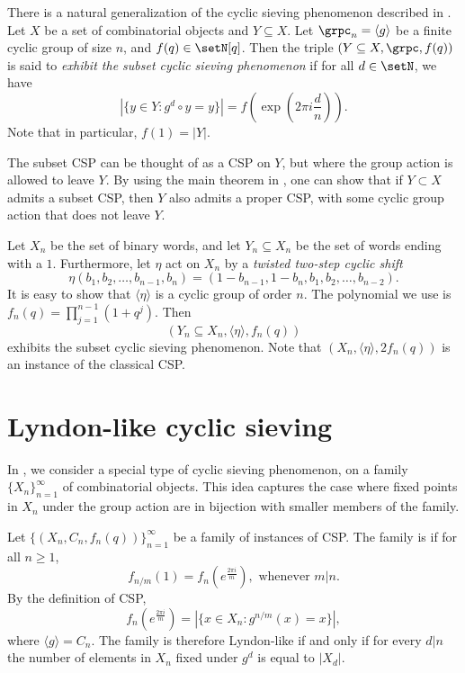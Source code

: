 There is a natural generalization of the cyclic sieving phenomenon described in 
\cite{AlexanderssonLinussonPotka2019}.
Let $X$ be a set of combinatorial objects and $Y \subseteq X$. 
Let $\grpc_n = \langle g \rangle$ be a finite cyclic group of size $n$, and $f(q) \in \setN[q]$.
Then the triple $(Y\subseteq X,\grpc,f(q))$ is said to 
\emph{exhibit the subset cyclic sieving phenomenon} if for all $d \in \setN$, we have
\[
|\{y \in Y : g^d \circ y = y \}| = f\left(\exp\left(2\pi i  \frac{d}{n}\right)\right).
\]
Note that in particular, $f(1)=|Y|$.

The subset CSP can be thought of as a CSP on $Y$, but where the group action
is allowed to leave $Y$. By using the main theorem in \cite{AlexanderssonAmini2018},
one can show that if $Y\subset X$ admits a subset CSP,
then $Y$ also admits a proper CSP, with some cyclic group action that does not leave $Y$.


\begin{example}

Let $X_n$ be the set of binary words, and let $Y_n \subseteq X_n$ be the set of words ending with a $1$.
Furthermore, let $\eta$ act on $X_n$ by a \emph{twisted two-step cyclic shift}
\[
\eta(b_1,b_2,\dotsc,b_{n-1},b_n) = (1-b_{n-1},1-b_n,b_1,b_2,\dotsc,b_{n-2}).
\]
It is easy to show that $\langle \eta \rangle$ is a cyclic group of order $n$.
The polynomial we use is $f_n(q) = \prod_{j=1}^{n-1}(1+q^j)$.
Then
\[
(Y_n \subseteq X_n, \langle \eta \rangle, f_n(q))
\]
exhibits the subset cyclic sieving phenomenon.
Note that $(X_n, \langle \eta \rangle, 2f_n(q))$ is an instance of the classical CSP.
\end{example}

\section[lyndonCSP]{Lyndon-like cyclic sieving}

In \cite{AlexanderssonLinussonPotka2019}, we consider a special type of 
cyclic sieving phenomenon, on a family $\{X_n\}_{n=1}^\infty$ of combinatorial objects.
This idea captures the case where fixed points in $X_n$ under the group action
are in bijection with smaller members of the family.

\begin{definition}
Let $\{(X_n, C_n, f_n(q))\}_{n=1}^\infty$ be a family of instances of CSP.
The family is  if for all $n\geq 1$,
\[
 f_{n/m}(1) = f_n\left( e^{\tfrac{2 \pi i}{m}} \right), \text{ whenever } m|n.
\]
By the definition of CSP,
\[
 f_n\left( e^{\tfrac{2 \pi i}{m}} \right) = |\{ x \in X_n : g^{n/m}(x) = x \}|,
\]
where $\langle g \rangle = C_n$.
The family is therefore Lyndon-like if and only if
for every $d|n$ the number of elements in $X_n$ fixed under $g^{d}$ is equal to $|X_{d}|$.
\end{definition}

